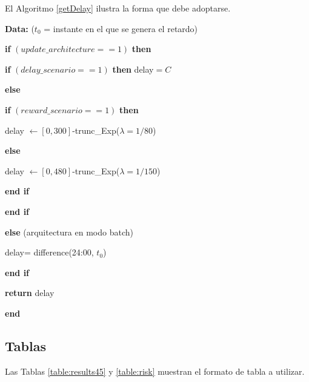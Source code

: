 \documentclass[spanish,12pt, a4paper, twoside]{paper}
\begin{document}
El Algoritmo \ref{getDelay} ilustra la forma que debe adoptarse. 
\begin{algorithm}[h]
{\bf  Data:} ($t_0$ = instante en el que se genera el retardo)
\medskip

\hspace{0.5em} {\bf if} $(update\_architecture==1)$ {\bf then} 

\hspace{1.5em} {\bf if} $(delay\_scenario==1)$ {\bf then} delay$=C$

\hspace{1.5em} {\bf else} 

\hspace{2.5em} {\bf if} $(reward\_scenario==1)$ {\bf then} 

\hspace{3.5em} delay $\leftarrow [0,300]$-trunc\_Exp($\lambda=1/80$)

\hspace{2.5em} {\bf else} 

\hspace{3.5em} delay $\leftarrow [0,480]$-trunc\_Exp($\lambda=1/150$)

\hspace{2.5em} {\bf end if}

\hspace{1.5em} {\bf end if}

\hspace{0.5em} {\bf else} (arquitectura en modo batch)

\hspace{1.5em} delay= difference(24:00, $t_0$)

\hspace{0.5em} {\bf end if}

\hspace{0.5em}  {\bf return} delay

{\bf end} 
\caption{$getDelay(t_0)$}
\label{getDelay}
\end{algorithm}


\subsection{Tablas}
Las Tablas \ref{table:results45} y \ref{table:risk} muestran el formato de tabla a utilizar.
\end{document}
